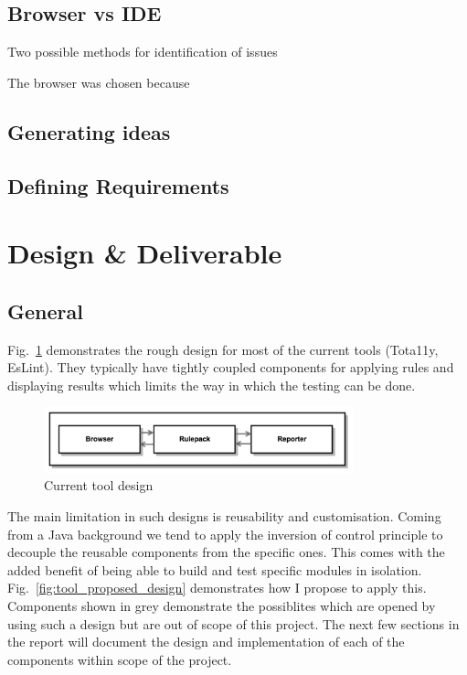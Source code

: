 \subsection{Browser vs IDE}
Two possible methods for identification of issues

The browser was chosen because


\subsection{Generating ideas}

\subsection{Defining Requirements}

\section{Design \& Deliverable}
\subsection{General}
Fig.~\ref{fig:tool_current_design} demonstrates the rough design for most of
the current tools (Tota11y, EsLint). They typically have tightly coupled
components for applying rules and displaying results which limits the way in
which the testing can be done.

\begin{figure}[H]
\centering
\includegraphics[width=0.8\textwidth]{figures/a11y_tool_current_design}
\captionsetup{justification=centering}
\caption{Current tool design
\label{fig:tool_current_design}}
\end{figure}

The main limitation in such designs is reusability and customisation. Coming
from a Java background we tend to apply the inversion of control principle to
decouple the reusable components from the specific ones. This comes with the
added benefit of being able to build and test specific modules in isolation.
Fig.~\ref{fig:tool_proposed_design} demonstrates how I propose to apply
this. Components shown in grey demonstrate the possiblites which are opened
by using such a design but are out of scope of this project. The next few
sections in the report will document the design and implementation of each of
the components within scope of the project.

